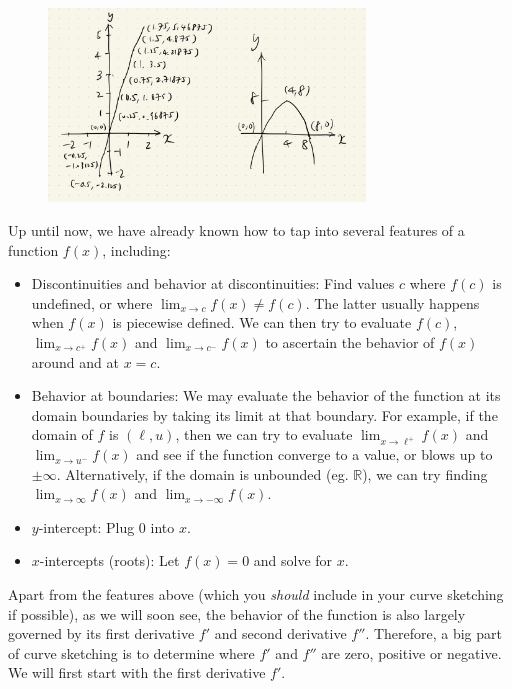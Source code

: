 \begin{figure}[ht]
    \centering
    \includegraphics[width = 0.75\textwidth]{figures/chap 05/sketching_demo.png}
    \label{fig: sketching_demo}
\end{figure}

Up until now, we have already known how to tap into several features of a function $f(x)$, including:
\begin{itemize}
    \item Discontinuities and behavior at discontinuities: Find values $c$ where $f(c)$ is undefined, or where $\lim_{x\rightarrow c}f(x) \ne f(c)$. The latter usually happens when $f(x)$ is piecewise defined.  We can then try to evaluate $f(c)$, $\lim_{x \rightarrow c^+}f(x)$ and $\lim_{x \rightarrow c^-}f(x)$ to ascertain the behavior of $f(x)$ around and at $x=c$.
    \item Behavior at boundaries: We may evaluate the behavior of the function at its domain boundaries by taking its limit at that boundary. For example, if the domain of $f$ is $(\ell, u)$, then we can try to evaluate $\lim_{x \rightarrow \ell^+}f(x)$ and $\lim_{x \rightarrow u^-}f(x)$ and see if the function converge to a value, or blows up to $\pm \infty$.  Alternatively, if the domain is unbounded (eg. $\mathbb{R}$), we can try finding $\lim_{x \rightarrow \infty}f(x)$ and $\lim_{x \rightarrow -\infty}f(x)$.
    \item $y$-intercept: Plug $0$ into $x$.
    \item $x$-intercepts (roots): Let $f(x)=0$ and solve for $x$.
\end{itemize}

Apart from the features above (which you \textit{should} include in your curve sketching if possible), as we will soon see, the behavior of the function is also largely governed by its first derivative $f'$ and second derivative $f''$.  Therefore, a big part of curve sketching is to determine where $f'$ and $f''$ are zero, positive or negative.  We will first start with the first derivative $f'$.

